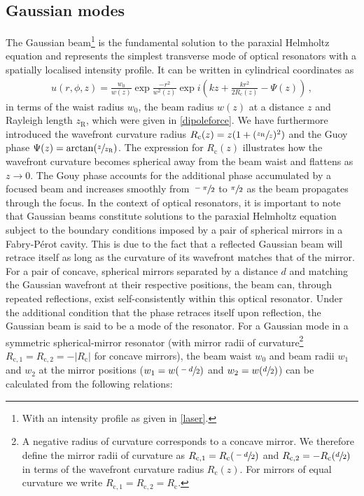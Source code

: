 \documentclass[../Thesis-IJspeert.tex]{subfiles}
\begin{document}
\subsection{Gaussian modes}
The Gaussian beam\footnote{With an intensity profile as given in \autoref{laser}.} is the fundamental solution to the paraxial Helmholtz equation and represents the simplest transverse mode of optical resonators with a spatially localised intensity profile. It can be written in cylindrical coordinates as \cite{Saleh1991}
\begin{align}
	\label{gaussianmode}
	u(r, \phi, z) = \frac{w_0}{w(z)}\exp{\frac{-r^2}{w^2(z)}}\exp{i\left( kz + \frac{kr^2}{2R_\mathrm{c}(z)} - \Psi(z)\right)}\,,
\end{align}
in terms of the waist radius $w_0$, the beam radius $w(z)$ at a distance $z$ and Rayleigh length $z_\mathrm{R}$, which were given in \autoref{dipoleforce}. We have furthermore introduced the wavefront curvature radius $R_\mathrm{c}(z)=z(1+(\sfrac{z_\mathrm{R}}{z})^2)$ and the Guoy phase $\Psi(z)=\arctan\left(\sfrac{z}{z_\mathrm{R}}\right)$. The expression for $R_\mathrm{c}(z)$ illustrates how the wavefront curvature becomes spherical away from the beam waist and flattens as $z \to 0$. The Gouy phase accounts for the additional phase accumulated by a focused beam and increases smoothly from $\sfrac{-\pi}{2}$ to $\sfrac{\pi}{2}$ as the beam propagates through the focus. In the context of optical resonators, it is important to note that Gaussian beams constitute solutions to the paraxial Helmholtz equation subject to the boundary conditions imposed by a pair of spherical mirrors in a Fabry-Pérot cavity. This is due to the fact that a reflected Gaussian beam will retrace itself as long as the curvature of its wavefront matches that of the mirror. For a pair of concave, spherical mirrors separated by a distance $d$ and matching the Gaussian wavefront at their respective positions, the beam can, through repeated reflections, exist self-consistently within this optical resonator. Under the additional condition that the phase retraces itself upon reflection, the Gaussian beam is said to be a mode of the resonator. For a Gaussian mode in a symmetric spherical-mirror resonator (with mirror radii of curvature\footnote{A negative radius of curvature corresponds to a concave mirror. We therefore define the mirror radii of curvature as $R_{\mathrm{c},1}=R_\mathrm{c}(\sfrac{-d}{2})$ and $R_{\mathrm{c},2}=-R_\mathrm{c}(\sfrac{d}{2})$ in terms of the wavefront curvature radius $R_\mathrm{c}(z)$. For mirrors of equal curvature we write $R_{\mathrm{c},1}=R_{\mathrm{c},2}= R_\mathrm{c}$.} $R_{\mathrm{c},1}=R_{\mathrm{c},2}=-\lvert R_\mathrm{c} \rvert$ for concave mirrors), the beam waist $w_0$ and beam radii $w_1$ and $w_2$ at the mirror positions ($w_1=w(\sfrac{-d}{2})$ and $w_2=w(\sfrac{d}{2})$) can be calculated from the following relations:
\end{document}
